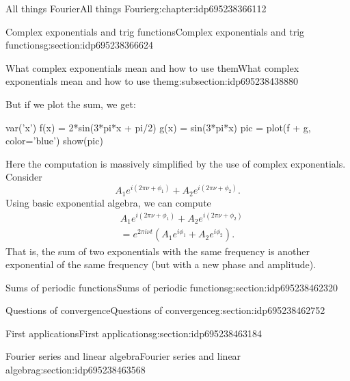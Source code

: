 \documentclass[oneside,10pt,]{book}
\numberwithin{equation}{section}
\numberwithin{equation}{section}
\newcommand{\amp}{&}
\begin{document}
\begin{chapterptx}{All things Fourier}{}{All things Fourier}{}{}{g:chapter:idp695238366112}
\begin{sectionptx}{Complex exponentials and trig functions}{}{Complex exponentials and trig functions}{}{}{g:section:idp695238366624}
\begin{subsectionptx}{What complex exponentials mean and how to use them}{}{What complex exponentials mean and how to use them}{}{}{g:subsection:idp695238438880}
\begin{sageinput}
\end{sageinput}
But if we plot the sum, we get:%
\begin{sageinput}
var('x')
f(x) = 2*sin(3*pi*x + pi/2)
g(x) = sin(3*pi*x)
pic = plot(f + g, color='blue')
show(pic)
\end{sageinput}
Here the computation is massively simplified by the use of complex exponentials. Consider%
\begin{equation*}
A_1 e^{i(2 \pi \nu + \phi_1)} + A_2 e^{i(2 \pi \nu + \phi_2)}.
\end{equation*}
Using basic exponential algebra, we can compute%
\begin{align*}
\amp A_1 e^{i(2 \pi \nu + \phi_1)} + A_2 e^{i(2 \pi \nu + \phi_2)}\\
\amp = e^{2 \pi i \nu t}\left(A_1 e^{i\phi_1} + A_2 e^{i\phi_2}\right).
\end{align*}
That is, the sum of two exponentials with the same frequency is another exponential of the same frequency (but with a new phase and amplitude).%
\end{subsectionptx}
\end{sectionptx}
%
%
\typeout{************************************************}
\typeout{************************************************}
%
\begin{sectionptx}{Sums of periodic functions}{}{Sums of periodic functions}{}{}{g:section:idp695238462320}
\end{sectionptx}
%
%
\typeout{************************************************}
\typeout{************************************************}
%
\begin{sectionptx}{Questions of convergence}{}{Questions of convergence}{}{}{g:section:idp695238462752}
\end{sectionptx}
%
%
\typeout{************************************************}
\typeout{************************************************}
%
\begin{sectionptx}{First applications}{}{First applications}{}{}{g:section:idp695238463184}
\end{sectionptx}
%
%
\typeout{************************************************}
\typeout{************************************************}
%
\begin{sectionptx}{Fourier series and linear algebra}{}{Fourier series and linear algebra}{}{}{g:section:idp695238463568}

\end{sectionptx}
\end{chapterptx}
\end{document}
